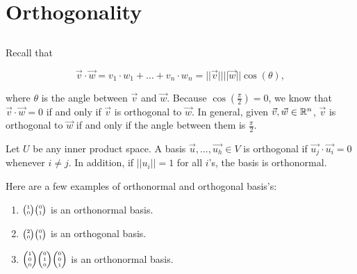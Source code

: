\section{Orthogonality}

\subsection{}

  Recall that 

  \begin{equation}
    \vec{v}\cdot\vec{w}=v_1\cdot w_1+\ldots+v_n\cdot w_n = | | \vec{v} | | | | \vec{w} | | \cos(\theta)
  ,\end{equation}

  where $\theta$ is the angle between $\vec{v}$ and $\vec{w}$. Because $\cos\left(\frac{\pi}{2}\right)=0$, we know that $\vec{v}\cdot\vec{w}=0$ if and only if $\vec{v}$ is orthogonal to $\vec{w}$. In general, given $\vec{v},\vec{w}\in\mathbb{R}^n$, $\vec{v}$ is orthogonal to $\vec{w}$ if and only if the angle between them is $\frac{\pi}{2}$.

  \begin{definition}
    Let $U$ be any inner product space. A basis $\vec{u},\ldots,\vec{u_h}\in V$ is orthogonal if $\vec{u_j}\cdot \vec{u_i} = 0$ whenever $i\neq j$.\newline
    In addition, if $| |u_i| |=1$ for all $i$'s, the basis is orthonormal.
  \end{definition}
  
  Here are a few examples of orthonormal and orthogonal basis's:

  \begin{enumerate}
    \item $\SmallMatrix{1\\0}\SmallMatrix{0\\1}$ is an orthonormal basis.
    \item $\SmallMatrix{2\\0}\SmallMatrix{0\\1}$ is an orthogonal basis.
    \item $\SmallMatrix{1\\0\\0}\SmallMatrix{0\\1\\0}\SmallMatrix{0\\0\\1}$ is an orthonormal basis.
  \end{enumerate}

